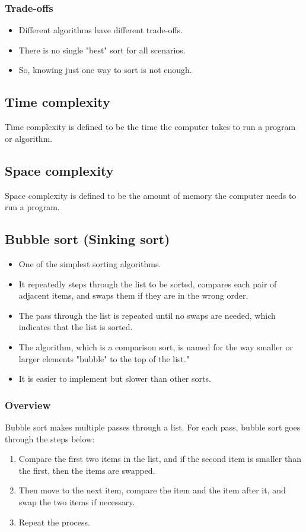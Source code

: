 \documentclass[11pt]{article}
\begin{document}
\subsubsection{Trade-offs}
\label{sec:org48c2efb}
\begin{itemize}
\item Different algorithms have different trade-offs.
\item There is no single "best" sort for all scenarios.
\item So, knowing just one way to sort is not enough.
\end{itemize}

\subsection{Time complexity}
\label{sec:org8092d5c}
Time complexity is defined to be the time the computer takes to run a program or algorithm.

\subsection{Space complexity}
\label{sec:org9833157}
Space complexity is defined to be the amount of memory the computer needs to run a program.

\subsection{Bubble sort (Sinking sort)}
\label{sec:orgbf7385a}
\begin{itemize}
\item One of the simplest sorting algorithms.
\item It repeatedly steps through the list to be sorted, compares each pair of adjacent items, and swaps them if they are in the wrong order.
\item The pass through the list is repeated until no swaps are needed, which indicates that the list is sorted.
\item The algorithm, which is a comparison sort, is named for the way smaller or larger elements "bubble" to the top of the list."
\item It is easier to implement but slower than other sorts.
\end{itemize}

\subsubsection{Overview}
\label{sec:org37a6d19}
Bubble sort makes multiple passes through a list. For each pass, bubble sort goes through the steps below:
\begin{enumerate}
\item Compare the first two items in the list, and if the second item is smaller than the first, then the items are swapped.
\item Then move to the next item, compare the item and the item after it, and swap the two items if necessary.
\item Repeat the process.
\end{enumerate}
\end{document}
